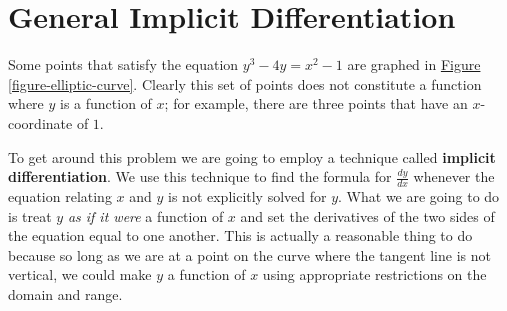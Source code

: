 \documentclass[12pt,]{book}
\newcommand{\terminology}[1]{\textbf{#1}}
\theoremstyle{plain}
\theoremstyle{definition}
\numberwithin{equation}{section}
\newcounter{figstack}
\newcounter{figindex}
\newlength\fight
\newcommand\pushValignCaptionBottom[5][b]{%
\stepcounter{figstack}%
\expandafter\def\csname %
figalign\romannumeral\value{figstack}\endcsname{#1}%
\expandafter\def\csname %
figtype\romannumeral\value{figstack}\endcsname{#2}%
\expandafter\def\csname %
figwd\romannumeral\value{figstack}\endcsname{#3}%
\expandafter\def\csname %
figcontent\romannumeral\value{figstack}\endcsname{#4}%
\expandafter\def\csname %
figcap\romannumeral\value{figstack}\endcsname{#5}%
\setbox0=\hbox{%
\begin{#2}{#3}#4\end{#2}}%
\ifdim\dimexpr\ht0+\dp0\relax>\fight\global\setlength{\fight}{%
\dimexpr\ht0+\dp0\relax}\fi%
}
\newcommand\popValignCaptionBottom{%
\setcounter{figindex}{0}%
\hfill%
\whiledo{\value{figindex}<\value{figstack}}{%
\stepcounter{figindex}%
\def\tmp{\csname figwd\romannumeral\value{figindex}\endcsname}%
\begin{\csname figtype\romannumeral\value{figindex}\endcsname}[t]{\tmp}%
\centering%
\stackinset{c}{}%
{\csname figalign\romannumeral\value{figindex}\endcsname}{}%
{\csname figcontent\romannumeral\value{figindex}\endcsname}%
{\rule{0pt}{\fight}}\par%
\csname figcap\romannumeral\value{figindex}\endcsname%
\end{\csname figtype\romannumeral\value{figindex}\endcsname}%
\hfill%
}%
\setcounter{figstack}{0}%
\setlength{\fight}{0pt}%
\hfill%
}
\newcommand{\lz}[2]{\frac{d#1}{d#2}}
\begin{document}
\section[General Implicit Differentiation]{General Implicit Differentiation}\label{section-general-implicit-differentiation}
Some points that satisfy the equation \(y^3-4y=x^2-1\) are graphed in \hyperref[figure-elliptic-curve]{Figure \ref{figure-elliptic-curve}}.  Clearly this set of points does not constitute a function where \(y\) is a function of \(x\); for example, there are three points that have an \(x\)-coordinate of \(1\).%
\par
To get around this problem we are going to employ a technique called \terminology{implicit differentiation}.  We use this technique to find the formula for \(\lz{y}{x}\) whenever the equation relating \(x\) and \(y\) is not explicitly solved for \(y\).  What we are going to do is treat \(y\) \emph{as if it were} a function of \(x\) and set the derivatives of the two sides of the equation equal to one another.  This is actually a reasonable thing to do because so long as we are at a point on the curve where the tangent line is not vertical, we could make \(y\) a function of \(x\) using appropriate restrictions on the domain and range.%
\end{document}
